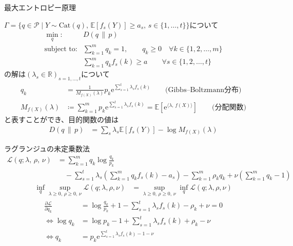 \documentclass[lualatex,handout]{beamer}
\newcommand{\expt}[1]{\mathbb{E}\left[#1\right]}
\newcommand\KL[2]{D\left(#1\,\|\,#2\right)}
\theoremstyle{definition}
\begin{document}
\begin{frame}{最大エントロピー原理}
\footnotesize
\begin{theorem}
$\Gamma=\{q\in\mathcal{P}\mid Y\sim\mathrm{Cat}(q),\,\expt{f_s(Y)}\ge a_s,\, s\in\{1,\dotsc,t\}\}$について
\begin{align*}
\min_{q}\colon& \KL{q}{p}\\
\text{subject to}\colon& \sum_{k=1}^m q_k = 1,\qquad
q_k\ge 0\quad\forall k\in\{1,2,\dotsc,m\}\\
&\sum_{k=1}^m q_k f_s(k) \ge a\qquad \forall s\in\{1,2,\dotsc,t\} 
\end{align*}
の解は$(\lambda_s\in\mathbb{R})_{s=1,\dotsc,t}$について
\begin{align*}
q_k &= \frac1{M_{f(X)}(\lambda)} p_k\mathrm{e}^{\sum_{s=1}^t \lambda_s f_s(k)}\qquad\text{(Gibbs--Boltzmann分布)}\\
M_{f(X)}(\lambda) &\coloneq \sum_{k=1}^m p_k\mathrm{e}^{\sum_{s=1}^t \lambda_s f_s(k)} = \expt{\mathrm{e}^{\langle \lambda,\, f(X)\rangle}} \qquad \text{(分配関数)}
\end{align*}
と表すことができ、目的関数の値は
\begin{align*}
\KL{q}{p} &= \sum_{s}\lambda_s\expt{f_s(Y)} -\log M_{f(X)}(\lambda)
\end{align*}
\end{theorem}
\end{frame}

\begin{frame}{ラグランジュの未定乗数法}
\begin{align*}
\mathcal{L}(q;\lambda,\,\rho,\,\nu) &= \sum_{k=1}^m q_k\log\frac{q_k}{p_k}\\
&\quad - \sum_{s=1}^t \lambda_s \left(\sum_{k=1}^m q_k f_s(k) - a_s\right) - \sum_{k=1}^m \rho_k q_k + \nu \left(\sum_{k=1}^m q_k - 1\right)
\end{align*}
\begin{align*}
\inf_{q}\sup_{\lambda\ge 0,\, \rho\ge0,\, \nu} \mathcal{L}(q;\lambda,\rho,\nu) &= 
\sup_{\lambda\ge 0,\, \rho\ge0,\, \nu}\inf_{q} \mathcal{L}(q;\lambda,\rho,\nu)
\end{align*}
\begin{align*}
\frac{\partial \mathcal{L}}{\partial q_k} &= \log\frac{q_k}{p_k} + 1 - \sum_{s=1}^t \lambda_s f_s(k) - \rho_k + \nu = 0\\
\iff \log q_k &= \log p_k - 1 + \sum_{s=1}^t \lambda_s f_s(k) + \rho_k - \nu\\
\iff q_k &= p_k \mathrm{e}^{\sum_{s=1}^t \lambda_s f_s(k) - 1 - \nu}\\
\end{align*}
\end{frame}
\end{document}
